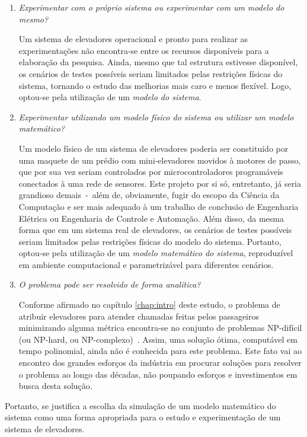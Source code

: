 \begin{enumerate}
\item \textit{Experimentar com o próprio sistema ou experimentar com um modelo
do mesmo?}

Um sistema de elevadores operacional e pronto para realizar as experimentações
não encontra-se entre os recursos disponíveis para a elaboração da pesquisa.
Ainda, mesmo que tal estrutura estivesse disponível, os cenários de testes
possíveis seriam limitados pelas restrições físicas do sistema, tornando o
estudo das melhorias mais caro e menos flexível. Logo, optou-se pela utilização
de um \textit{modelo do sistema}.

\item \textit{Experimentar utilizando um modelo físico do sistema ou utilizar um
modelo matemático?}

Um modelo físico de um sistema de elevadores poderia ser constituído por uma
maquete de um prédio com mini-elevadores movidos à motores de passo, que por
sua vez seriam controlados por microcontroladores programáveis conectados à uma
rede de sensores. Este projeto por si só, entretanto, já seria grandioso
demais~-~além de, obviamente, fugir do escopo da Ciência da Computação e ser
mais adequado à um trabalho de conclusão de Engenharia Elétrica ou Engenharia de
Controle e Automação. Além disso, da mesma forma que em um sistema real de
elevadores, os cenários de testes possíveis seriam limitados pelas restrições
físicas do modelo do sistema. Portanto, optou-se pela utilização de um
\textit{modelo matemático do sistema}, reproduzível em ambiente computacional e
parametrizável para diferentes cenários.

\item \textit{O problema pode ser resolvido de forma analítica?}

Conforme afirmado no capítulo \ref{chap:intro} deste estudo, o problema de
atribuir elevadores para atender chamadas feitas pelos passageiros minimizando
alguma métrica encontra-se no conjunto de problemas NP-difícil (ou
NP-hard, ou NP-complexo)~\cite{SeKo99}. Assim, uma solução ótima, computável
em tempo polinomial, ainda não é conhecida para este problema. Este fato vai ao
encontro dos grandes esforços da indústria em procurar soluções para resolver o
problema ao longo das décadas, não poupando esforços e investimentos em busca
desta solução.

\end{enumerate}

Portanto, se justifica a escolha da simulação de um modelo matemático do sistema
como uma forma apropriada para o estudo e experimentação de um sistema de
elevadores.

